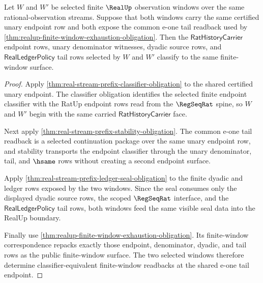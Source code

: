 \begin{theorem}
\label{thm:realup-finite-window-tail-determinacy}
Let $W$ and $W'$ be selected finite $\RealUp$ observation windows over the
same rational-observation streams. Suppose that both windows carry the same
certified unary endpoint row and both expose the common e-one tail readback
used by \autoref{thm:realup-finite-window-exhaustion-obligation}. Then the
$\mathsf{RatHistoryCarrier}$ endpoint rows, unary denominator witnesses,
dyadic source rows, and $\mathsf{RealLedgerPolicy}$ tail rows selected by $W$
and $W'$ classify to the same finite-window surface.
\end{theorem}
\begin{proof}
Apply \autoref{thm:real-stream-prefix-classifier-obligation} to the shared
certified unary endpoint. The classifier obligation identifies the selected
finite endpoint classifier with the RatUp endpoint rows read from the
$\RegSeqRat$ spine, so $W$ and $W'$ begin with the same carried
$\mathsf{RatHistoryCarrier}$ face.

Next apply \autoref{thm:real-stream-prefix-stability-obligation}. The common
e-one tail readback is a selected continuation package over the same unary
endpoint row, and stability transports the endpoint classifier through the
unary denominator, tail, and $\hsame$ rows without creating a second endpoint
surface.

Apply \autoref{thm:real-stream-prefix-ledger-seal-obligation} to the finite
dyadic and ledger rows exposed by the two windows. Since the seal consumes
only the displayed dyadic source rows, the scoped $\RegSeqRat$ interface, and
the $\mathsf{RealLedgerPolicy}$ tail rows, both windows feed the same visible
seal data into the RealUp boundary.

Finally use \autoref{thm:realup-finite-window-exhaustion-obligation}. Its
finite-window correspondence repacks exactly those endpoint, denominator,
dyadic, and tail rows as the public finite-window surface. The two selected
windows therefore determine classifier-equivalent finite-window readbacks at
the shared e-one tail endpoint.
\end{proof}

